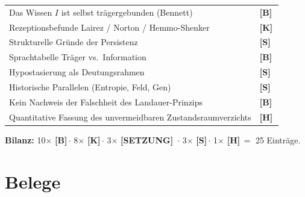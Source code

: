 \documentclass[11pt,a4paper]{article}
\newcommand{\LS}{\textcolor{laySet}{\textbf{\footnotesize\textsf{[SETZUNG]}}}\,}
\newcommand{\LK}{\textcolor{layK}{\textbf{\footnotesize\textsf{[K]}}}\,}
\newcommand{\LB}{\textcolor{layB}{\textbf{\footnotesize\textsf{[B]}}}\,}
\newcommand{\LSk}{\textcolor{layS}{\textbf{\footnotesize\textsf{[S]}}}\,}
\newcommand{\LH}{\textcolor{layH}{\textbf{\footnotesize\textsf{[H]}}}\,}
\theoremstyle{ffgft}
\begin{document}
\begin{center}
\begin{longtable}{@{}p{}l@{}}
Das Wissen $I$ ist selbst trägergebunden (Bennett) & \LB \\
Rezeptionsbefunde Lairez / Norton / Hemmo-Shenker & \LK \\
Strukturelle Gründe der Persistenz & \LSk \\
Sprachtabelle Träger vs.\ Information & \LB \\
Hypostasierung als Deutungsrahmen & \LSk \\
Historische Parallelen (Entropie, Feld, Gen) & \LSk \\
Kein Nachweis der Falschheit des Landauer-Prinzips & \LB \\
Quantitative Fassung des unvermeidbaren Zustandsraumverzichts & \LH \\
\bottomrule
\end{longtable}
\end{center}

\textbf{Bilanz:} 10$\times$ \LB $\cdot$ 8$\times$ \LK $\cdot$ 3$\times$ \LS
$\cdot$ 3$\times$ \LSk $\cdot$ 1$\times$ \LH $=$ 25 Einträge.

\clearpage
{}
{}
\section*{Belege}
\end{document}
